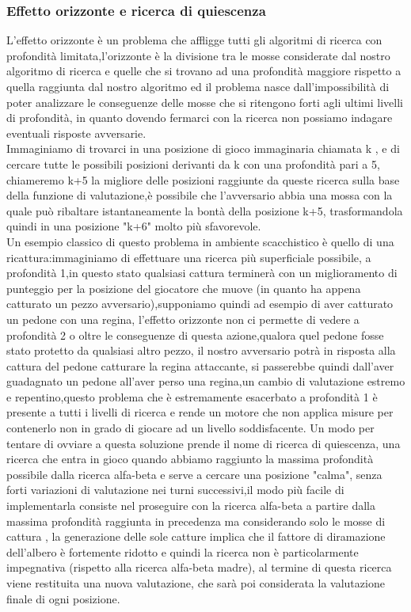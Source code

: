 \subsubsection{Effetto orizzonte e ricerca di quiescenza}
L'effetto orizzonte è un problema che affligge tutti gli algoritmi di ricerca con profondità limitata,l'orizzonte è la divisione 
tra le mosse considerate dal nostro algoritmo di ricerca e quelle  che si trovano ad una profondità maggiore rispetto a quella raggiunta dal nostro algoritmo 
ed il problema nasce dall'impossibilità di poter analizzare le conseguenze delle mosse che si ritengono forti agli ultimi livelli di profondità, in quanto dovendo fermarci con la ricerca
non possiamo indagare eventuali risposte avversarie.\\
Immaginiamo di trovarci in una posizione di gioco immaginaria chiamata k , e di cercare tutte le possibili posizioni derivanti da k con una profondità pari a 5,
chiameremo k+5 la migliore delle posizioni raggiunte da queste ricerca sulla base della funzione di valutazione,è possibile che
l'avversario abbia una mossa con la quale può ribaltare istantaneamente la bontà della posizione k+5, trasformandola quindi in una posizione
"k+6" molto più sfavorevole.\\
Un esempio classico di questo problema in ambiente scacchistico è quello di una ricattura:immaginiamo 
di effettuare una ricerca più superficiale possibile, a profondità 1,in questo stato qualsiasi cattura terminerà con un miglioramento di punteggio 
per la posizione del giocatore che muove (in quanto ha appena catturato un pezzo avversario),supponiamo quindi ad esempio di aver catturato un pedone con una regina,
l'effetto orizzonte non ci permette di vedere a profondità 2 o oltre le conseguenze di questa azione,qualora quel pedone fosse stato 
protetto da qualsiasi altro pezzo, il nostro avversario potrà in risposta alla cattura del pedone catturare la regina attaccante,
si passerebbe quindi dall'aver guadagnato un pedone all'aver perso una regina,un cambio di valutazione estremo e repentino,questo problema che è estremamente esacerbato a profondità 1 è presente a tutti i livelli di ricerca e rende un motore che non applica misure per contenerlo 
non in grado di giocare ad un livello soddisfacente. Un modo per tentare di ovviare a questa soluzione prende il nome di ricerca di quiescenza, una ricerca che entra in gioco quando abbiamo raggiunto la massima 
profondità possibile dalla ricerca alfa-beta e serve a cercare una posizione "calma", senza forti variazioni di valutazione nei turni successivi,il modo più facile di implementarla consiste nel proseguire con la ricerca
alfa-beta a partire dalla massima profondità raggiunta in precedenza ma considerando solo le mosse di cattura , la generazione delle sole catture implica che il fattore di diramazione dell'albero è fortemente ridotto e quindi la 
ricerca non è particolarmente impegnativa (rispetto alla ricerca alfa-beta madre), al termine di questa ricerca viene restituita una nuova valutazione, che sarà poi considerata la valutazione finale di ogni posizione.


